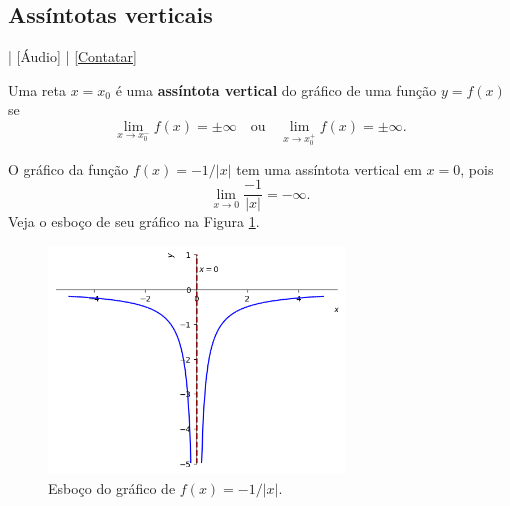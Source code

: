 \subsection{Assíntotas verticais}

\begin{flushright}
  [Vídeo] | [Áudio] | \href{https://phkonzen.github.io/notas/contato.html}{[Contatar]}
\end{flushright}

Uma reta $x=x_0$ é uma {\bf assíntota vertical} do gráfico de uma função $y = f(x)$ se
\begin{equation}
  \lim_{x\to x_0^-} f(x) = \pm\infty\quad\text{ou}\quad\lim_{x\to x_0^+} f(x) = \pm\infty.
\end{equation}

\begin{ex}
  O gráfico da função $f(x)=-1/|x|$ tem uma assíntota vertical em $x=0$, pois
  \begin{equation}
    \lim_{x\to 0} \frac{-1}{|x|} = -\infty.
  \end{equation}
  Veja o esboço de seu gráfico na Figura \ref{fig:ex_lim_assvert_1}.

  \begin{figure}[H]
    \centering
    \includegraphics[width=0.7\textwidth]{./cap_lim/dados/fig_ex_lim_assvert_1/fig_ex_lim_assvert_1}
    \caption{Esboço do gráfico de $f(x)=-1/|x|$.}
    \label{fig:ex_lim_assvert_1}
  \end{figure}  
\end{ex}

